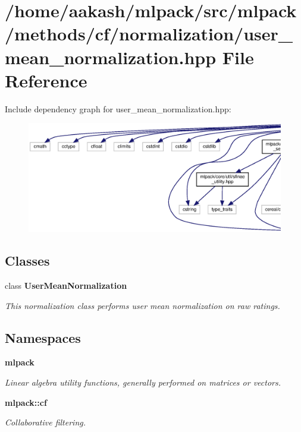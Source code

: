 \section{/home/aakash/mlpack/src/mlpack/methods/cf/normalization/user\+\_\+mean\+\_\+normalization.hpp File Reference}
\label{user__mean__normalization_8hpp}
Include dependency graph for user\+\_\+mean\+\_\+normalization.\+hpp\+:
\nopagebreak
\begin{figure}[H]
\begin{center}
\leavevmode
\includegraphics[width=350pt]{user__mean__normalization_8hpp__incl}
\end{center}
\end{figure}
\subsection*{Classes}
\begin{DoxyCompactItemize}
\item 
class \textbf{ User\+Mean\+Normalization}
\begin{DoxyCompactList}\small\item\em This normalization class performs user mean normalization on raw ratings. \end{DoxyCompactList}\end{DoxyCompactItemize}
\subsection*{Namespaces}
\begin{DoxyCompactItemize}
\item 
 \textbf{ mlpack}
\begin{DoxyCompactList}\small\item\em Linear algebra utility functions, generally performed on matrices or vectors. \end{DoxyCompactList}\item 
 \textbf{ mlpack\+::cf}
\begin{DoxyCompactList}\small\item\em Collaborative filtering. \end{DoxyCompactList}\end{DoxyCompactItemize}


